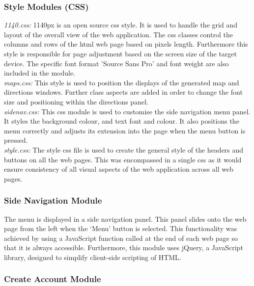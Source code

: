\documentclass[10pt,twocolumn]{witseiepaper}
\begin{document}
		\subsubsection{Style Modules (CSS)}
		
		\textit{1140.css:}  1140px is an open source css style. It is used to handle the grid and layout of the overall view of the web application. The css classes control the columns and rows of the html web page based on pixels length. Furthermore this style is responsible for page adjustment based on the screen size of the target device. The specific font format 'Source Sans Pro' and font weight are also included in the module.\\
		
		\textit{maps.css:} This style is used to position the displays of the generated map and directions windows. Further class aspects are added in order to change the font size and positioning within the directions panel.\\
		
		\textit{sidenav.css:} This css module is used to customise the side navigation menu panel. It styles the background colour, and text font and colour. It also positions the menu correctly and adjusts its extension into the page when the menu button is pressed.\\
		
		\textit{style.css:} The style css file is used to create the general style of the headers and buttons on all the web pages. This was encompassed in a single css as it would ensure consistency of all visual aspects of the web application across all web pages.  
		
		\subsubsection{Side Navigation Module}
		
		The menu is displayed in a side navigation panel. This panel slides onto the web page from the left when the `Menu' button is selected. This functionality was achieved by using a JavaScript function called at the end of each web page so that it is always accessible. Furthermore, this module uses jQuery, a JavaScript library, designed to simplify client-side scripting of HTML.	
		
		\subsubsection{Create Account Module}
		
\end{document}
